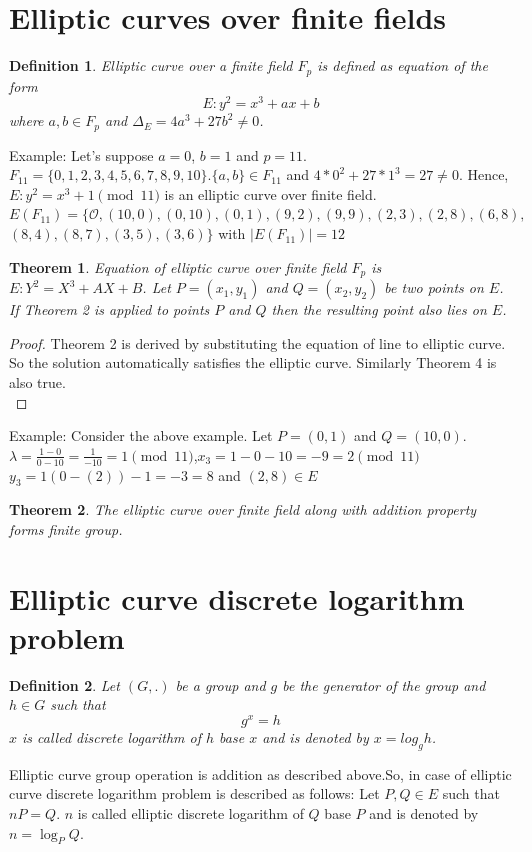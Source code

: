 \documentclass[a4paper,12pt]{report}
\newtheorem{theorem}{Theorem}
\newtheorem{definition}{Definition}
\begin{document}
\section{Elliptic curves over finite fields}
\begin{definition}
	Elliptic curve over a finite field $F_p$ is defined as equation of the form $$E:y^2 = x^3+ax+b$$ where $a,b\in F_p$ and $\Delta_E = 4a^3+27b^2\neq 0$.
\end{definition}
Example:
Let's suppose $a=0$, $b=1$ and $p=11$. \\
$F_{11}=\{0,1,2,3,4,5,6,7,8,9,10\}$.$\{a,b\}\in F_{11}$ and $4*0^2+27*1^3=27\neq 0$. Hence, $E:y^2 = x^3+1 \pmod {11} $ is an elliptic curve over finite field. \\
$E(F_{11}) = \{\mathscr{O},(10,0),(0,10),(0,1),(9,2),(9,9),(2,3),(2,8),(6,8),$\\$(8,4),(8,7),(3,5),(3,6)\}$
	with $|E(F_{11})|=12$
	\begin{theorem}
		Equation of elliptic curve over finite field $F_p$ is $E : Y^2=X^3+
			AX+B$. Let $P=(x_1,y_1)$ and $Q=(x_2,y_2)$ be two points on $E$. If Theorem 2 is applied to points $P$ and $Q$ then the resulting point also lies on $E$.
	\end{theorem}
	\begin{proof}
		Theorem 2 is derived by substituting the equation of line to elliptic curve. So the solution automatically satisfies the elliptic curve. Similarly Theorem 4 is also true.\\
	\end{proof}
	Example: Consider the above example. Let $P=(0,1)$ and $Q=(10,0)$.
$\lambda = \frac{1-0}{0-10} = \frac{1}{-	10} = 1 \pmod{11}$,$x_3=1-0-10=-9=2 \pmod{11}$\\ $y_3=1(0-(2))-1=-3=8$ and $(2,8) \in E$ \begin{theorem}
		The elliptic curve over finite field along with addition property forms finite group.
	\end{theorem}

	
	\section{Elliptic curve discrete logarithm problem}

	\begin{definition}
		Let $(G,.)$ be a group and $g$ be the generator of the group and $h\in G$ such that $$g^x=h$$
		$x$ is called discrete logarithm of $h$ base $x$ and is denoted by $x=log_g h$.
	\end{definition}
	Elliptic curve group operation is addition as described above.So, in case of elliptic curve discrete logarithm problem is described as follows:
	Let $P,Q \in E$ such that $nP=Q$. $n$ is called elliptic discrete logarithm of $Q$ base $P$ and is denoted by $n =\log_P Q$.
\end{document}
